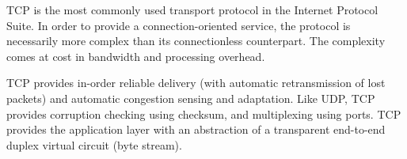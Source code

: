 \documentclass[10pt]{report}
\begin{document}
TCP \cite{rfc793} is the most commonly used transport protocol in the
Internet Protocol Suite.  In order to provide a connection-oriented service, the
protocol is necessarily more complex than its connectionless
counterpart.  The complexity comes at cost in bandwidth and processing
overhead.

TCP provides in-order reliable delivery (with automatic retransmission
of lost packets) and automatic congestion sensing and adaptation.  Like
UDP, TCP provides corruption checking using checksum, and multiplexing
using ports.  TCP provides the application layer with an abstraction of
a transparent end-to-end duplex virtual circuit (byte stream).
\cite{rfc1180}

%
%
%
%
%
%



%
%


\thispagestyle{fancy}
\end{document}
